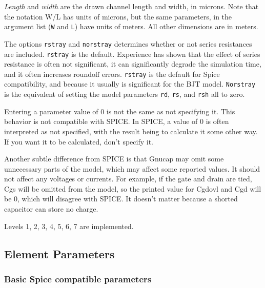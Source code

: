 {\it Length} and {\it width} are the drawn channel length and width, in
microns.  Note that the notation W/L has units of microns, but the same
parameters, in the argument list ({\tt W} and {\tt L}) have units of meters.
All other dimensions are in meters.

The options {\tt rstray} and {\tt norstray} determines whether or not
series resistances are included.  {\tt rstray} is the default.
Experience has shown that the effect of series resistance is often not
significant, it can significantly degrade the simulation time, and it
often increases roundoff errors.  {\tt rstray} is the default for
Spice compatibility, and because it usually is significant for the BJT
model.  {\tt Norstray} is the equivalent of setting the model
parameters {\tt rd}, {\tt rs}, and {\tt rsh} all to zero.

Entering a parameter value of 0 is not the same as not specifying
it.  This behavior is not compatible with SPICE.  In SPICE, a value
of 0 is often interpreted as not specified, with the result being
to calculate it some other way.  If you want it to be calculated,
don't specify it.

Another subtle difference from SPICE is that Gnucap may omit some
unnecessary parts of the model, which may affect some reported
values.  It should not affect any voltages or currents.  For example,
if the gate and drain are tied, Cgs will be omitted from the model,
so the printed value for Cgdovl and Cgd will be 0, which will
disagree with SPICE.  It doesn't matter because a shorted capacitor
can store no charge.

Levels 1, 2, 3, 4, 5, 6, 7 are implemented.
\subsection{Element Parameters}

\subsubsection{Basic Spice compatible parameters}

